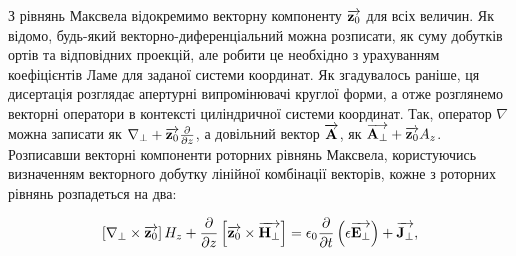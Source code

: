 З рівнянь Максвела відокремимо векторну компоненту $ \overrightarrow{\mathbf z_0} $ для всіх 
величин. Як відомо, будь-який векторно-диференціальний можна 
розписати, як суму добутків ортів та відповідних проекцій, але робити це 
необхідно з урахуванням коефіцієнтів Ламе \cite{imp:Korn1974} для заданої 
системи координат. Як згадувалось раніше, ця дисертація розглядає апертурні 
випромінювачі круглої форми, а отже розглянемо векторні оператори в контексті 
циліндричної системи координат. Так, оператор $ \nabla $ можна записати як 
$ \nabla_\perp + \overrightarrow{\mathbf z_0} \frac{\partial }{\partial z} $, а довільний вектор
$ \overrightarrow{\mathbf A} $, як $ \overrightarrow{\mathbf A_\perp} + \overrightarrow{\mathbf z_0} A_z $. Розписавши векторні 
компоненти роторних рівнянь Максвела, користуючись визначенням векторного 
добутку лінійної комбінації векторів, кожне з роторних рівнянь розпадеться 
на два:

%
%
\begin{equation} \label{eq:rotHt} 
\left[ \nabla_\perp \times \overrightarrow{\mathbf z_0} \right] H_z +
\frac{\partial }{\partial z} \left[ \overrightarrow{\mathbf z_0} \times \overrightarrow{\mathbf H_\perp} \right] =
\epsilon_0 \frac{\partial }{\partial t} \left( \epsilon  \overrightarrow{\mathbf E_\perp} \right) + 
\overrightarrow{\mathbf J_\perp},
\end{equation}

